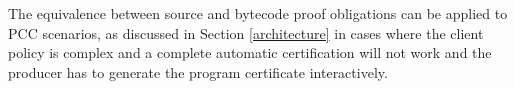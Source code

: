 

 The equivalence between source and bytecode proof obligations can be applied to PCC scenarios, as discussed in Section \ref{architecture} in cases where the
 client policy is complex and a complete automatic certification will not work and the producer has to generate the program certificate interactively. 






